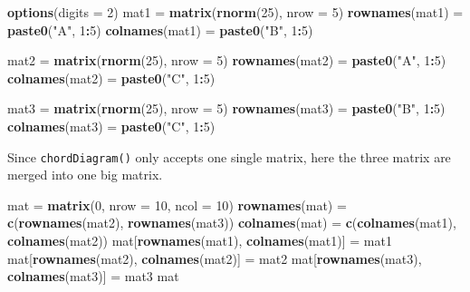 \documentclass[]{book}
\newenvironment{Shaded}{\begin{snugshade}}{\end{snugshade}}
\newcommand{\KeywordTok}[1]{\textcolor[rgb]{0.13,0.29,0.53}{\textbf{#1}}}
\newcommand{\DataTypeTok}[1]{\textcolor[rgb]{0.13,0.29,0.53}{#1}}
\newcommand{\DecValTok}[1]{\textcolor[rgb]{0.00,0.00,0.81}{#1}}
\newcommand{\StringTok}[1]{\textcolor[rgb]{0.31,0.60,0.02}{#1}}
\newcommand{\OperatorTok}[1]{\textcolor[rgb]{0.81,0.36,0.00}{\textbf{#1}}}
\newcommand{\NormalTok}[1]{#1}
\begin{document}
\begin{Shaded}
\begin{Highlighting}[]
\KeywordTok{options}\NormalTok{(}\DataTypeTok{digits =} \DecValTok{2}\NormalTok{)}
\NormalTok{mat1 =}\StringTok{ }\KeywordTok{matrix}\NormalTok{(}\KeywordTok{rnorm}\NormalTok{(}\DecValTok{25}\NormalTok{), }\DataTypeTok{nrow =} \DecValTok{5}\NormalTok{)}
\KeywordTok{rownames}\NormalTok{(mat1) =}\StringTok{ }\KeywordTok{paste0}\NormalTok{(}\StringTok{"A"}\NormalTok{, }\DecValTok{1}\OperatorTok{:}\DecValTok{5}\NormalTok{)}
\KeywordTok{colnames}\NormalTok{(mat1) =}\StringTok{ }\KeywordTok{paste0}\NormalTok{(}\StringTok{"B"}\NormalTok{, }\DecValTok{1}\OperatorTok{:}\DecValTok{5}\NormalTok{)}

\NormalTok{mat2 =}\StringTok{ }\KeywordTok{matrix}\NormalTok{(}\KeywordTok{rnorm}\NormalTok{(}\DecValTok{25}\NormalTok{), }\DataTypeTok{nrow =} \DecValTok{5}\NormalTok{)}
\KeywordTok{rownames}\NormalTok{(mat2) =}\StringTok{ }\KeywordTok{paste0}\NormalTok{(}\StringTok{"A"}\NormalTok{, }\DecValTok{1}\OperatorTok{:}\DecValTok{5}\NormalTok{)}
\KeywordTok{colnames}\NormalTok{(mat2) =}\StringTok{ }\KeywordTok{paste0}\NormalTok{(}\StringTok{"C"}\NormalTok{, }\DecValTok{1}\OperatorTok{:}\DecValTok{5}\NormalTok{)}

\NormalTok{mat3 =}\StringTok{ }\KeywordTok{matrix}\NormalTok{(}\KeywordTok{rnorm}\NormalTok{(}\DecValTok{25}\NormalTok{), }\DataTypeTok{nrow =} \DecValTok{5}\NormalTok{)}
\KeywordTok{rownames}\NormalTok{(mat3) =}\StringTok{ }\KeywordTok{paste0}\NormalTok{(}\StringTok{"B"}\NormalTok{, }\DecValTok{1}\OperatorTok{:}\DecValTok{5}\NormalTok{)}
\KeywordTok{colnames}\NormalTok{(mat3) =}\StringTok{ }\KeywordTok{paste0}\NormalTok{(}\StringTok{"C"}\NormalTok{, }\DecValTok{1}\OperatorTok{:}\DecValTok{5}\NormalTok{)}
\end{Highlighting}
\end{Shaded}

Since \texttt{chordDiagram()} only accepts one single matrix, here the
three matrix are merged into one big matrix.

\begin{Shaded}
\begin{Highlighting}[]
\NormalTok{mat =}\StringTok{ }\KeywordTok{matrix}\NormalTok{(}\DecValTok{0}\NormalTok{, }\DataTypeTok{nrow =} \DecValTok{10}\NormalTok{, }\DataTypeTok{ncol =} \DecValTok{10}\NormalTok{)}
\KeywordTok{rownames}\NormalTok{(mat) =}\StringTok{ }\KeywordTok{c}\NormalTok{(}\KeywordTok{rownames}\NormalTok{(mat2), }\KeywordTok{rownames}\NormalTok{(mat3))}
\KeywordTok{colnames}\NormalTok{(mat) =}\StringTok{ }\KeywordTok{c}\NormalTok{(}\KeywordTok{colnames}\NormalTok{(mat1), }\KeywordTok{colnames}\NormalTok{(mat2))}
\NormalTok{mat[}\KeywordTok{rownames}\NormalTok{(mat1), }\KeywordTok{colnames}\NormalTok{(mat1)] =}\StringTok{ }\NormalTok{mat1}
\NormalTok{mat[}\KeywordTok{rownames}\NormalTok{(mat2), }\KeywordTok{colnames}\NormalTok{(mat2)] =}\StringTok{ }\NormalTok{mat2}
\NormalTok{mat[}\KeywordTok{rownames}\NormalTok{(mat3), }\KeywordTok{colnames}\NormalTok{(mat3)] =}\StringTok{ }\NormalTok{mat3}
\NormalTok{mat}
\end{Highlighting}
\end{Shaded}
\end{document}
